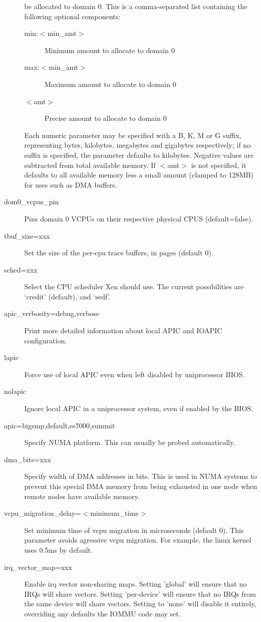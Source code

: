 \documentclass[11pt,twoside,final,openright]{report}
\begin{document}
\begin{description}
  be allocated to domain 0. This is a comma-separated list containing
  the following optional components:
  \begin{description}
  \item[ min:$<$min\_amt$>$ ] Minimum amount to allocate to domain 0
  \item[ max:$<$min\_amt$>$ ] Maximum amount to allocate to domain 0
  \item[ $<$amt$>$ ] Precise amount to allocate to domain 0
  \end{description}
  Each numeric parameter may be specified with a B, K, M or
  G suffix, representing bytes, kilobytes, megabytes and gigabytes
  respectively; if no suffix is specified, the parameter defaults to
  kilobytes. Negative values are subtracted from total available
  memory. If $<$amt$>$ is not specified, it defaults to all available
  memory less a small amount (clamped to 128MB) for uses such as DMA
  buffers.
\item [ dom0\_vcpus\_pin ] Pins domain 0 VCPUs on their respective
  physical CPUS (default=false).
\item [ tbuf\_size=xxx ] Set the size of the per-cpu trace buffers, in
  pages (default 0).  
\item [ sched=xxx ] Select the CPU scheduler Xen should use.  The
  current possibilities are `credit' (default), and `sedf'.
\item [ apic\_verbosity=debug,verbose ] Print more detailed
  information about local APIC and IOAPIC configuration.
\item [ lapic ] Force use of local APIC even when left disabled by
  uniprocessor BIOS.
\item [ nolapic ] Ignore local APIC in a uniprocessor system, even if
  enabled by the BIOS.
\item [ apic=bigsmp,default,es7000,summit ] Specify NUMA platform.
  This can usually be probed automatically.
\item [ dma\_bits=xxx ] Specify width of DMA addresses in bits. This
  is used in NUMA systems to prevent this special DMA memory from
  being exhausted in one node when remote nodes have available memory.
\item [ vcpu\_migration\_delay=$<$minimum\_time$>$] Set minimum time of 
  vcpu migration in microseconds (default 0). This parameter avoids agressive
  vcpu migration. For example, the linux kernel uses 0.5ms by default.
\item [ irq\_vector\_map=xxx ] Enable irq vector non-sharing maps.  Setting 'global' 
  will ensure that no  IRQs will share vectors.  Setting 'per-device' will ensure 
  that no IRQs from the same device will share vectors.  Setting to 'none' will
  disable it entirely, overriding any defaults the IOMMU code may set.
\end{description}
\end{document}
